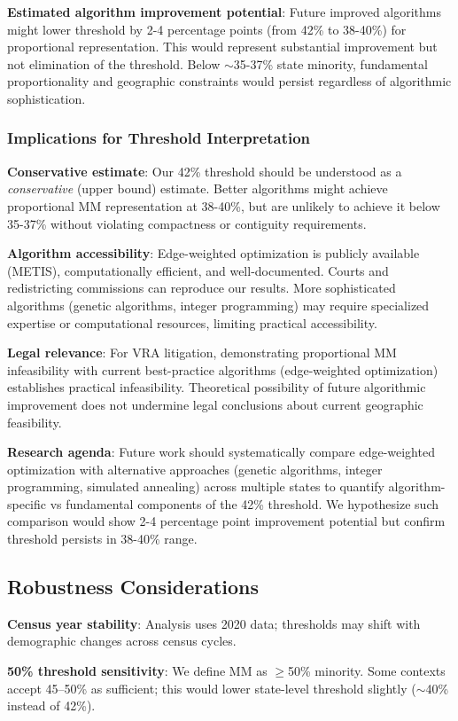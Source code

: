 \textbf{Estimated algorithm improvement potential}: Future improved algorithms might lower threshold by 2-4 percentage points (from 42\% to 38-40\%) for proportional representation. This would represent substantial improvement but not elimination of the threshold. Below $\sim$35-37\% state minority, fundamental proportionality and geographic constraints would persist regardless of algorithmic sophistication.

\subsubsection{Implications for Threshold Interpretation}

\textbf{Conservative estimate}: Our 42\% threshold should be understood as a \textit{conservative} (upper bound) estimate. Better algorithms might achieve proportional MM representation at 38-40\%, but are unlikely to achieve it below 35-37\% without violating compactness or contiguity requirements.

\textbf{Algorithm accessibility}: Edge-weighted optimization is publicly available (METIS), computationally efficient, and well-documented. Courts and redistricting commissions can reproduce our results. More sophisticated algorithms (genetic algorithms, integer programming) may require specialized expertise or computational resources, limiting practical accessibility.

\textbf{Legal relevance}: For VRA litigation, demonstrating proportional MM infeasibility with current best-practice algorithms (edge-weighted optimization) establishes practical infeasibility. Theoretical possibility of future algorithmic improvement does not undermine legal conclusions about current geographic feasibility.

\textbf{Research agenda}: Future work should systematically compare edge-weighted optimization with alternative approaches (genetic algorithms, integer programming, simulated annealing) across multiple states to quantify algorithm-specific vs fundamental components of the 42\% threshold. We hypothesize such comparison would show 2-4 percentage point improvement potential but confirm threshold persists in 38-40\% range.

\subsection{Robustness Considerations}

\textbf{Census year stability}: Analysis uses 2020 data; thresholds may shift with demographic changes across census cycles.

\textbf{50\% threshold sensitivity}: We define MM as $\geq$50\% minority. Some contexts accept 45--50\% as sufficient; this would lower state-level threshold slightly ($\sim$40\% instead of 42\%).
